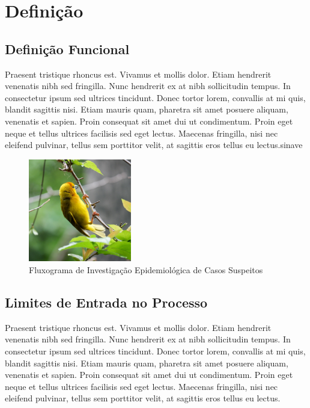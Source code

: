 \section{Definição}\label{sec:definicao}

    \subsection{Definição Funcional}\label{subsec:definicao-funcional}
    Praesent tristique rhoncus est. Vivamus et mollis dolor. Etiam hendrerit venenatis nibh sed fringilla. Nunc hendrerit ex at nibh sollicitudin tempus. In consectetur ipsum sed ultrices tincidunt. Donec tortor lorem, convallis at mi quis, blandit sagittis nisi. Etiam mauris quam, pharetra sit amet posuere aliquam, venenatis et sapien. Proin consequat sit amet dui ut condimentum. Proin eget neque et tellus ultrices facilisis sed eget lectus.\cite{decreto-lei_46-2008} Maecenas fringilla, nisi nec eleifend pulvinar, tellus sem porttitor velit, at sagittis eros tellus eu lectus.\acrshort{sinave}

    \begin{figure}[htbp]
    \centering
    \includegraphics[width=0.4\textwidth]{exemplo/sample.jpeg}
    \caption{Fluxograma de Investigação Epidemiológica de Casos Suspeitos}
    \label{fig:fluxograma}
    \end{figure}
    
    \subsection{Limites de Entrada no Processo}\label{subsec:limites-de-entrada-no-processo}
    Praesent tristique rhoncus est. Vivamus et mollis dolor. Etiam hendrerit venenatis nibh sed fringilla. Nunc hendrerit ex at nibh sollicitudin tempus. In consectetur ipsum sed ultrices tincidunt. Donec tortor lorem, convallis at mi quis, blandit sagittis nisi. Etiam mauris quam, pharetra sit amet posuere aliquam, venenatis et sapien. Proin consequat sit amet dui ut condimentum. Proin eget neque et tellus ultrices facilisis sed eget lectus. Maecenas fringilla, nisi nec eleifend pulvinar, tellus sem porttitor velit, at sagittis eros tellus eu lectus.

